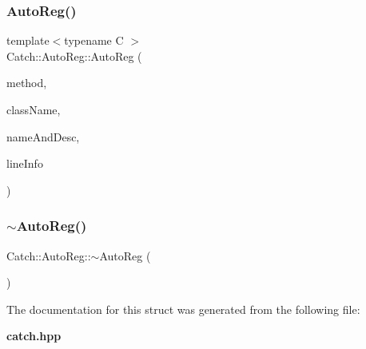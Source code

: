 \mbox{\label{struct_catch_1_1_auto_reg_a1bf9207fe0a02b46dc0ab1cc03cbe738}} 
\subsubsection{Auto\+Reg()\hspace{0.1cm}{\footnotesize\ttfamily [2/2]}}
{\footnotesize\ttfamily template$<$typename C $>$ \\
Catch\+::\+Auto\+Reg\+::\+Auto\+Reg (\begin{DoxyParamCaption}\item[{void(C\+::$\ast$)()}]{method,  }\item[{char const $\ast$}]{class\+Name,  }\item[{\textbf{ Name\+And\+Desc} const \&}]{name\+And\+Desc,  }\item[{\textbf{ Source\+Line\+Info} const \&}]{line\+Info }\end{DoxyParamCaption})\hspace{0.3cm}{\ttfamily [inline]}}

\mbox{\label{struct_catch_1_1_auto_reg_a3cdb53f1e5ff115310f3372bebe198f1}} 
\subsubsection{$\sim$\+Auto\+Reg()}
{\footnotesize\ttfamily Catch\+::\+Auto\+Reg\+::$\sim$\+Auto\+Reg (\begin{DoxyParamCaption}{ }\end{DoxyParamCaption})}



The documentation for this struct was generated from the following file\+:\begin{DoxyCompactItemize}
\item 
\textbf{ catch.\+hpp}\end{DoxyCompactItemize}
